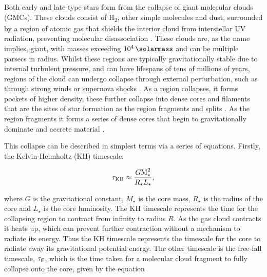 \begin{center}
\end{center}


Both early and late-type stars form from the collapse of giant molecular clouds (GMCs).
These clouds consist of H\textsubscript{2}, other simple molecules and dust, surrounded by a region of atomic gas that shields the interior cloud from interstellar UV radiation, preventing molecular disassociation \parencite{mckeeTheoryStarFormation2007}.
These clouds are, as the name implies, giant, with masses exceeding $10^4\,\si{\solarmass}$ and can be multiple parsecs in radius.
Whilst these regions are typically gravitationally stable due to internal turbulent pressure, and can have lifespans of tens of millions of years, regions of the cloud can undergo collapse through external perturbation, such as through strong winds or supernova shocks \parencite{heyerMolecularCloudsMilky2015}.
As a region collapses, it forms pockets of higher density, these further collapse into dense cores and filaments that are the sites of star formation as the region fragments and splits
\parencite{ladaEmbeddedClustersMolecular2003}.
As the region fragments it forms a series of dense cores that begin to gravitationally dominate and accrete material \parencite{zinneckerUnderstandingMassiveStar2007}.

This collapse can be described in simplest terms via a series of equations.
Firstly, the Kelvin-Helmholtz (KH) timescale:

\begin{equation}
  \label{eq:khtime}
  \tau_\text{KH} \approx \frac{G \text{M}_\star^2}{R_\star L_\star},  
\end{equation}

\noindent
where $G$ is the gravitational constant, $M_\star$ is the  core mass, $R_\star$ is the radius of the core and $L_\star$ is the core luminosity.
The KH timescale represents the time for the collapsing region to contract from infinity to radius $R$.
As the gas cloud contracts it heats up, which can prevent further contraction without a mechanism to radiate its energy.
Thus the KH timescale represents the timescale for the  core to radiate away its gravitational potential energy.
The other timescale is the free-fall timescale, $\tau_\text{ff}$, which is the time taken for a molecular cloud fragment to fully collapse onto the core, given by the equation

